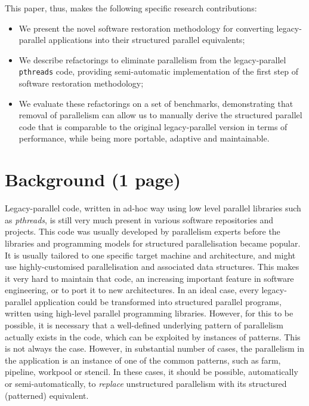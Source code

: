 \documentclass[runningheads]{llncs}
\begin{document}
This paper, thus, makes the following specific research contributions:
\begin{itemize}
    \item We present the novel software restoration methodology for converting legacy-parallel applications into their structured parallel equivalents;
    \item We describe refactorings to eliminate parallelism from the legacy-parallel \lstinline{pthreads} code, providing semi-automatic implementation of the first step of software restoration methodology;
    \item We evaluate these refactorings on a set of benchmarks, demonstrating that removal of parallelism can allow us to manually derive the structured parallel code that is comparable to the original legacy-parallel version in terms of performance, while being more portable, adaptive and maintainable.
\end{itemize}

\section{Background (1 page)}
Legacy-parallel code, written in ad-hoc way using low level parallel libraries such as \emph{pthreads}, is still very much present in various software repositories and projects. This code was usually developed by parallelism experts before the libraries and programming models for structured parallelisation became popular. It is usually tailored to one specific target machine and architecture, and might use highly-customised parallelisation and associated data structures. This makes it very hard to maintain that code, an increasing important feature in software engineering, or to port it to new architectures. In an ideal case, every legacy-parallel application could be transformed into structured parallel programs, written using high-level parallel programming libraries. However, for this to be possible, it is necessary that a well-defined underlying pattern of parallelism actually exists in the code, which can be exploited by instances of patterns. This is not always the case. However, in substantial number of cases, the parallelism in the application is an instance of one of the common patterns, such as farm, pipeline, workpool or stencil. In these cases, it should be possible, automatically or semi-automatically, to \emph{replace} unstructured parallelism with its structured (patterned) equivalent.   
\end{document}
